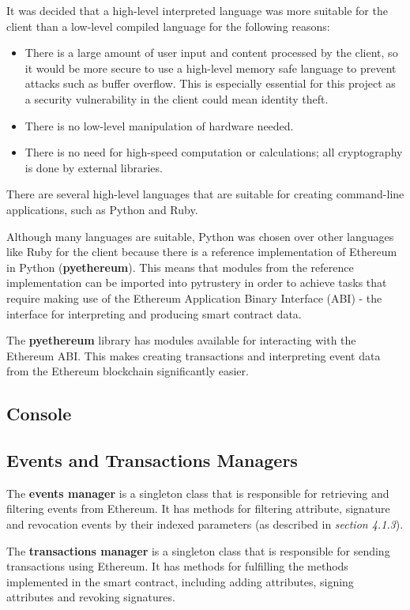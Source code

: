 \documentclass[12pt,a4paper]{report}
\begin{document}
	It was decided that a high-level interpreted language was more suitable for the client than a low-level compiled language for the following reasons:
	\begin{itemize}
		\item There is a large amount of user input and content processed by the client, so it would be more secure to use a high-level memory safe language to prevent attacks such as buffer overflow. This is especially essential for this project as a security vulnerability in the client could mean identity theft.
		\item There is no low-level manipulation of hardware needed.
		\item There is no need for high-speed computation or calculations; all cryptography is done by external libraries.
	\end{itemize}
	
	There are several high-level languages that are suitable for creating command-line applications, such as Python and Ruby.
	
	Although many languages are suitable, Python was chosen over other languages like Ruby for the client because there is a reference implementation of Ethereum in Python (\textbf{pyethereum}).\cite{16} This means that modules from the reference implementation can be imported into pytrustery in order to achieve tasks that require making use of the Ethereum Application Binary Interface (ABI)\cite{14} - the interface for interpreting and producing smart contract data.
	
	The \textbf{pyethereum} library has modules available for interacting with the Ethereum ABI. This makes creating transactions and interpreting event data from the Ethereum blockchain significantly easier.
	
	\subsection{Console}
	
	\subsection{Events and Transactions Managers}
	The \textbf{events manager} is a singleton class that is responsible for retrieving and filtering events from Ethereum. It has methods for filtering attribute, signature and revocation events by their indexed parameters (as described in \textit{section 4.1.3}).
	
	The \textbf{transactions manager} is a singleton class that is responsible for sending transactions using Ethereum. It has methods for fulfilling the methods implemented in the smart contract, including adding attributes, signing attributes and revoking signatures.
	
\end{document}

